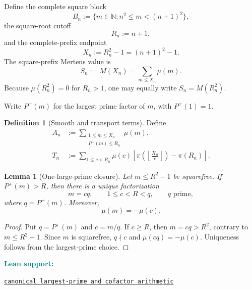 \documentclass[11pt]{article}
\newtheorem{lemma}[theorem]{Lemma}
\theoremstyle{definition}
\newtheorem{definition}[theorem]{Definition}
\newcommand{\Pplus}{P^{+}}
\newcommand{\1}{\mathbf{1}}
\newcommand{\N}{\mathbb{N}}
\newcommand{\leanxref}[3]{%
  \par\smallskip
  {\small\noindent\textcolor{teal}{\textbf{#1:}}\par
  \noindent\href{#3}{\nolinkurl{#2}}\par}
  \smallskip
}
\begin{document}
Define the complete square block
\begin{equation}
 B_n:=\{m\in\N:n^2\le m<(n+1)^2\},
 \label{eq:block}
\end{equation}
the square-root cutoff
\begin{equation}
 R_n:=n+1,
 \label{eq:Rn}
\end{equation}
and the complete-prefix endpoint
\begin{equation}
 X_n:=R_n^2-1=(n+1)^2-1.
 \label{eq:Xn}
\end{equation}
The square-prefix Mertens value is
\begin{equation}
 S_n:=M(X_n)=\sum_{m\le X_n}\mu(m).
 \label{eq:Sn}
\end{equation}
Because $\mu(R_n^2)=0$ for $R_n>1$, one may equally write $S_n=M(R_n^2)$.

Write $\Pplus(m)$ for the largest prime factor of $m$, with $\Pplus(1)=1$.

\begin{definition}[Smooth and transport terms]
\label{def:AT}
Define
\begin{align}
 A_n
 &:={\sum}_{\substack{1\le m\le X_n\\\Pplus(m)\le R_n}}\mu(m),
 \label{eq:An}\\
 T_n
 &:={\sum}_{1\le c<R_n}\mu(c)
 \left[
 \pi\!\left(\left\lfloor\frac{X_n}{c}\right\rfloor\right)-\pi(R_n)
 \right].
 \label{eq:Tn}
\end{align}
\end{definition}

\begin{lemma}[One-large-prime closure]
\label{lem:one-large}
Let $m\le R^2-1$ be squarefree.  If $\Pplus(m)>R$, then there is a unique factorization
\begin{equation}
 m=cq,
 \qquad
 1\le c<R<q,
 \qquad
 q\text{ prime},
 \label{eq:one-large}
\end{equation}
where $q=\Pplus(m)$.  Moreover,
\begin{equation}
 \mu(m)=-\mu(c).
 \label{eq:mobius-peel}
\end{equation}
\end{lemma}

\begin{proof}
Put $q=\Pplus(m)$ and $c=m/q$.  If $c\ge R$, then $m=cq>R^2$, contrary to $m\le R^2-1$.  Since $m$ is squarefree, $q\nmid c$ and $\mu(cq)=-\mu(c)$.  Uniqueness follows from the largest-prime choice.
\end{proof}
\leanxref{Lean support}{canonical largest-prime and cofactor arithmetic}{https://github.com/OVVO-Financial/square-block-mobius/blob/main/lean/RHLean/Analysis/CanonicalHighSectorCore.lean}
\end{document}
